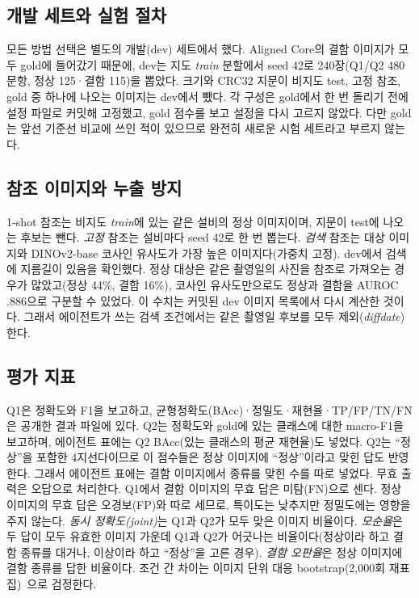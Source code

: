 \documentclass[11pt]{article}
\begin{document}
\subsection{개발 세트와 실험 절차}
모든 방법 선택은 별도의 개발(dev) 세트에서 했다. Aligned Core의 결함 이미지가 모두 gold에 들어갔기 때문에, dev는 지도 \emph{train} 분할에서 seed 42로 240장(Q1/Q2 480문항, 정상 125·결함 115)을 뽑았다. 크기와 CRC32 지문이 비지도 test, 고정 참조, gold 중 하나에 나오는 이미지는 dev에서 뺐다. 각 구성은 gold에서 한 번 돌리기 전에 설정 파일로 커밋해 고정했고, gold 점수를 보고 설정을 다시 고르지 않았다. 다만 gold는 앞선 기준선 비교에 쓰인 적이 있으므로 완전히 새로운 시험 세트라고 부르지 않는다.

\subsection{참조 이미지와 누출 방지}
1-shot 참조는 비지도 \emph{train}에 있는 같은 설비의 정상 이미지이며, 지문이 test에 나오는 후보는 뺀다. \emph{고정} 참조는 설비마다 seed 42로 한 번 뽑는다. \emph{검색} 참조는 대상 이미지와 DINOv2-base 코사인 유사도가 가장 높은 이미지다(가중치 고정). dev에서 검색에 지름길이 있음을 확인했다. 정상 대상은 같은 촬영일의 사진을 참조로 가져오는 경우가 많았고(정상 44\%, 결함 16\%), 코사인 유사도만으로도 정상과 결함을 AUROC .886으로 구분할 수 있었다. 이 수치는 커밋된 dev 이미지 목록에서 다시 계산한 것이다. 그래서 에이전트가 쓰는 검색 조건에서는 같은 촬영일 후보를 모두 제외(\emph{diffdate})한다.

\subsection{평가 지표}
Q1은 정확도와 F1을 보고하고, 균형정확도(BAcc)·정밀도·재현율·TP/FP/TN/FN은 공개한 결과 파일에 있다. Q2는 정확도와 gold에 있는 클래스에 대한 macro-F1을 보고하며, 에이전트 표에는 Q2 BAcc(있는 클래스의 평균 재현율)도 넣었다. Q2는 ``정상''을 포함한 4지선다이므로 이 점수들은 정상 이미지에 ``정상''이라고 맞힌 답도 반영한다. 그래서 에이전트 표에는 결함 이미지에서 종류를 맞힌 수를 따로 넣었다. 무효 출력은 오답으로 처리한다. Q1에서 결함 이미지의 무효 답은 미탐(FN)으로 센다. 정상 이미지의 무효 답은 오경보(FP)와 따로 세므로, 특이도는 낮추지만 정밀도에는 영향을 주지 않는다. \emph{동시 정확도(joint)}는 Q1과 Q2가 모두 맞은 이미지 비율이다. \emph{모순율}은 두 답이 모두 유효한 이미지 가운데 Q1과 Q2가 어긋나는 비율이다(정상이라 하고 결함 종류를 대거나, 이상이라 하고 ``정상''을 고른 경우). \emph{결함 오판율}은 정상 이미지에 결함 종류를 답한 비율이다. 조건 간 차이는 이미지 단위 대응 bootstrap(2,000회 재표집)~\cite{efron1994bootstrap}으로 검정한다.
\end{document}
